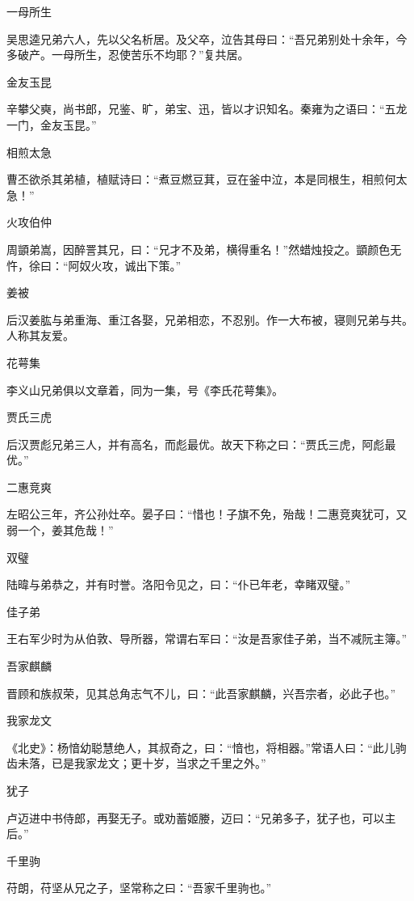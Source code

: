 \documentclass[a4paper,12pt,UTF8,twoside]{ctexbook}
\begin{document}
    一母所生
    
    吴思逵兄弟六人，先以父名析居。及父卒，泣告其母曰：“吾兄弟别处十余年，今多破产。一母所生，忍使苦乐不均耶？”复共居。
    
    金友玉昆
    
    辛攀父奭，尚书郎，兄鉴、旷，弟宝、迅，皆以才识知名。秦雍为之语曰：“五龙一门，金友玉昆。”
    
    相煎太急
    
    曹丕欲杀其弟植，植赋诗曰：“煮豆燃豆萁，豆在釜中泣，本是同根生，相煎何太急！”
    
    火攻伯仲
    
    周顗弟嵩，因醉詈其兄，曰：“兄才不及弟，横得重名！”然蜡烛投之。顗颜色无忤，徐曰：“阿奴火攻，诚出下策。”
    
    姜被
    
    后汉姜肱与弟重海、重江各娶，兄弟相恋，不忍别。作一大布被，寝则兄弟与共。人称其友爱。
    
    花萼集
    
    李义山兄弟俱以文章着，同为一集，号《李氏花萼集》。
    
    贾氏三虎
    
    后汉贾彪兄弟三人，并有高名，而彪最优。故天下称之曰：“贾氏三虎，阿彪最优。”
    
    二惠竞爽
    
    左昭公三年，齐公孙灶卒。晏子曰：“惜也！子旗不免，殆哉！二惠竞爽犹可，又弱一个，姜其危哉！”
    
    双璧
    
    陆暐与弟恭之，并有时誉。洛阳令见之，曰：“仆已年老，幸睹双璧。”
    
    佳子弟
    
    王右军少时为从伯敦、导所器，常谓右军曰：“汝是吾家佳子弟，当不减阮主簿。”
    
    吾家麒麟
    
    晋顾和族叔荣，见其总角志气不儿，曰：“此吾家麒麟，兴吾宗者，必此子也。”
    
    我家龙文
    
    《北史》：杨愔幼聪慧绝人，其叔奇之，曰：“愔也，将相器。”常语人曰：“此儿驹齿未落，已是我家龙文；更十岁，当求之千里之外。”
    
    犹子
    
    卢迈进中书侍郎，再娶无子。或劝蓄姬媵，迈曰：“兄弟多子，犹子也，可以主后。”
    
    千里驹
    
    苻朗，苻坚从兄之子，坚常称之曰：“吾家千里驹也。”
    
\end{document}
